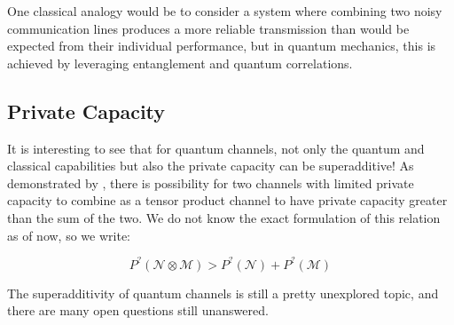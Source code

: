 One classical analogy would be to consider a system where combining two noisy communication
lines produces a more reliable transmission than would be expected from their individual
performance, but in quantum mechanics, this is achieved by leveraging entanglement and quantum
correlations.

\subsection{Private Capacity}

It is interesting to see that for quantum channels, not only the quantum and classical capabilities
but also the private capacity can be superadditive! As demonstrated by \cite{Li_2009}, there is
possibility for two channels with limited private capacity to combine as a tensor product channel
to have private capacity greater than the sum of the two. We do not know the exact formulation of
this relation as of now, so we write:

\begin{equation*}
    P^?(\mathcal{N} \otimes \mathcal{M}) > P^?(\mathcal{N}) + P^?(\mathcal{M})
\end{equation*}

The superadditivity of quantum channels is still a pretty unexplored topic, and there are many open
questions still unanswered.